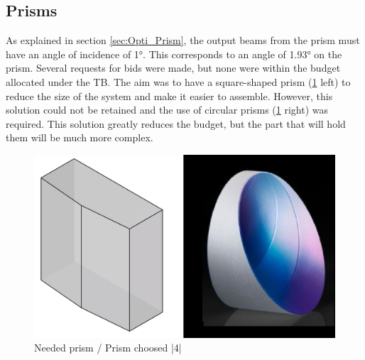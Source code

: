 \subsection{Prisms}
As explained in section \ref{sec:Opti_Prism}, the output beams from the prism must have an angle of incidence of 1°. 
This corresponds to an angle of 1.93° on the prism. \newline
Several requests for bids were made, but none were within the budget allocated under the TB. The aim was to have a square-shaped 
prism (\ref{fig:Prism_square} left) to reduce the size of the system and make it easier to assemble. However, this solution could not be retained and the 
use of circular prisms (\ref{fig:Prism_square} right) was required. This solution greatly reduces the budget, but the part that will hold them will be much more complex.
\begin{figure}[H]
    \centering
    \includegraphics[scale=0.5]{assets/figures/Mechanical Design/prisme_voulu.png}
    \caption{Needed prism / Prism choosed |4|}
    \label{fig:Prism_square}
\end{figure}
